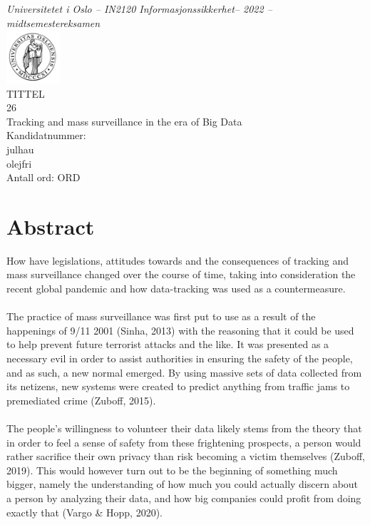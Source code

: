 \documentclass[11pt]{article}
\newcommand{\tittel}{TITTEL} %
\newcommand{\temanr}{26} %
\newcommand{\tematittel}{Tracking and mass surveillance in the era of Big Data} %
\newcommand{\kandidatnrforside}{julhau \\ olejfri}  %
\newcommand{\antallord}{ORD} %
\begin{document}
 \thispagestyle{empty}
\begin{center}
\normalsize{\textit{Universitetet i Oslo -- IN2120 Informasjonssikkerhet-- 2022 -- midtsemestereksamen}} \\
\vspace{1cm}
\includegraphics[width=0.15\textwidth]{uio_logo.png} \\
\vspace{1cm}
\huge{\tittel} \\
\Large{\temanr} \\
\Large{\tematittel} \\
\vspace{1cm}
\Large{Kandidatnummer:} \\
\large{\kandidatnrforside} \\
\vspace{1cm}
\Large{Antall ord: \antallord} \\
\end{center}
\tableofcontents
\newpage



\section{Abstract}
How have legislations, attitudes towards and the consequences of tracking and mass surveillance changed over the course of time, taking into consideration the recent global pandemic and how data-tracking was used as a countermeasure. \\ \\

The practice of mass surveillance was first put to use as a result of the happenings of 9/11 2001 (Sinha, 2013) with the reasoning that it could be used to help prevent future terrorist attacks and the like. It was presented as a necessary evil in order to assist authorities in ensuring the safety of the people, and as such, a new normal emerged. By using massive sets of data collected from its netizens, new systems were created to predict anything from traffic jams to premediated crime (Zuboff, 2015).  \\ \\

The people’s willingness to volunteer their data likely stems from the theory that in order to feel a sense of safety from these frightening prospects, a person would rather sacrifice their own privacy than risk becoming a victim themselves (Zuboff, 2019). This would however turn out to be the beginning of something much bigger, namely the understanding of how much you could actually discern about a person by analyzing their data, and how big companies could profit from doing exactly that (Vargo \& Hopp, 2020).  \\ \\
\end{document}
